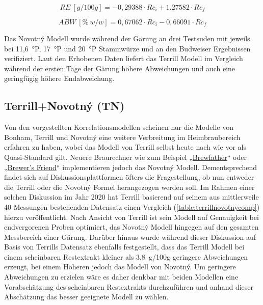 \documentclass[a4paper,parskip=half]{scrartcl}
\newcommand{\bxic}{\mathit{Rc}_i}
\newcommand{\bxfc}{\mathit{Rc}_f}
\newcommand{\abw}{\mathit{ABW}}
\newcommand{\rex}{\mathit{RE}}
\begin{document}
\begin{equation}
\rex\:[g/100g] = -0,29388 \cdot \bxic + 1.27582 \cdot \bxfc
\label{eq:novotnyre}
\end{equation}

\begin{equation}
\abw\:[\%\:w/w] = 0,67062 \cdot \bxic - 0,66091 \cdot \bxfc
\label{eq:novotnyabw}
\end{equation}

Das Novotný Modell wurde während der Gärung an drei Testsuden mit jeweils
bei 11,6~°P, 17~°P und 20~°P Stammwürze und an den Budweiser
Ergebnissen verifiziert. Laut den Erhobenen Daten liefert das Terrill
Modell im Vergleich während der ersten Tage der Gärung höhere
Abweichungen und auch eine geringfügig höhere Endabweichung.
\autocite{Novotny2017a,Novotny2017}

\subsection*{Terrill+Novotný (TN)}

Von den vorgestellten Korrelationsmodellen scheinen nur die
Modelle von Bonham, Terrill und Novotný eine weitere Verbreitung im Heimbraubereich erfahren zu haben, wobei das Modell von Terrill selbst
heute nach wie vor als Quasi-Standard gilt. Neuere Braurechner
wie zum Beispiel „\href{https://brewfather.app}{Brewfather}“
oder „\href{https://www.brewersfriend.com/refractometer-calculator}
{Brewer's Friend}“ implementieren jedoch das Novotný Modell.
Dementsprechend findet sich auf Diskussionsplattformen öfters die Fragestellung, ob nun
entweder die Terrill oder die Novotný Formel herangezogen werden
soll. Im Rahmen einer solchen Diskussion im Jahr 2020 hat Terrill
basierend auf seinem aus mittlerweile 40 Messungen bestehenden Datensatz
einen Vergleich (\autoref{table:terrillnovotnycomp}) hierzu veröffentlicht.
Nach Ansicht von Terrill ist sein Modell auf Genauigkeit bei endvergorenen
Proben optimiert, das Novotný Modell hingegen auf den gesamten
Messbereich einer Gärung. Darüber hinaus wurde während dieser Diskussion
auf Basis von Terrills Datensatz ebenfalls festgestellt, dass das
Terrill Modell bei einem scheinbaren Restextrakt kleiner als 3,8~g/100g 
geringere Abweichungen erzeugt, bei einem Höheren jedoch das Modell von
Novotný. Um geringere Abweichungen zu erzielen wäre es daher denkbar mit
beiden Modellen eine Vorabschätzung des scheinbaren Restextrakts
durchzuführen und anhand dieser Abschätzung das besser geeignete Modell zu
wählen. \autocite{h22lude2020}
\end{document}
